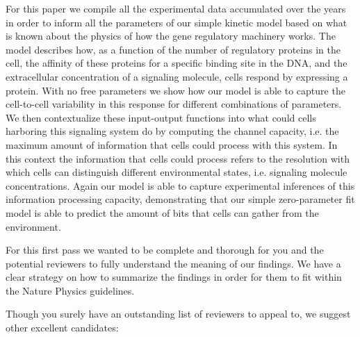 For this paper we compile all the experimental data accumulated over the years
in order to inform all the parameters of our simple kinetic model based on what
is known about the physics of how the gene regulatory machinery works. The model
describes how, as a function of the number of regulatory proteins in the cell,
the affinity of these proteins for a specific binding site in the DNA, and the
extracellular concentration of a signaling molecule, cells respond by expressing
a protein. With no free parameters we show how our model is able to capture the
cell-to-cell variability in this response for different combinations of
parameters. We then contextualize these input-output functions into what could
cells harboring this signaling system do by computing the channel capacity, i.e.
the maximum amount of information that cells could process with this system. In
this context the information that cells could process refers to the resolution
with which cells can distinguish different environmental states, i.e.
signaling molecule concentrations. Again our model is able to capture
experimental inferences of this information processing capacity, demonstrating
that our simple zero-parameter fit model is able to predict the amount of bits
that cells can gather from the environment.

For this first pass we wanted to be complete and thorough for you and the
potential reviewers to fully understand the meaning of our findings. We have a
clear strategy on how to summarize the findings in order for them to fit within
the Nature Physics guidelines.

Though you surely have an outstanding list of reviewers to appeal to, we suggest
other excellent candidates:

